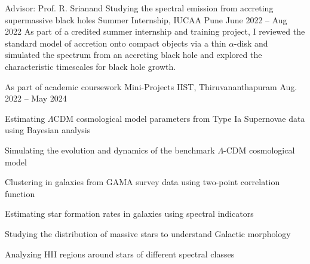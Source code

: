 \begin{cventries}
    \vspace{1mm}

    \cventry
    {Advisor: Prof. R. Srianand} %
    {Studying the spectral emission from accreting supermassive black holes} %
    {Summer Internship, IUCAA Pune} %
    {June 2022 -- Aug 2022} %
    { %
        As part of a credited summer internship and training project, I reviewed the standard model of accretion onto compact objects via a thin $\alpha$-disk and simulated the spectrum from an accreting black hole and explored the characteristic timescales for black hole growth.
    }

    \vspace{1mm}

    \cventry
    {As part of academic coursework}
    {Mini-Projects}
    {IIST, Thiruvananthapuram}
    {Aug. 2022 -- May 2024}
    {
        \begin{cvitems}
        \item Estimating $\Lambda$CDM cosmological model parameters from Type Ia Supernovae data using Bayesian analysis
        \item Simulating the evolution and dynamics of the benchmark $\Lambda$-CDM cosmological model
        \item Clustering in galaxies from GAMA survey data using two-point correlation function
        \item Estimating star formation rates in galaxies using spectral indicators
        \item Studying the distribution of massive stars to understand Galactic morphology
        \item Analyzing HII regions around stars of different spectral classes
        \end{cvitems}
    }

\end{cventries}
